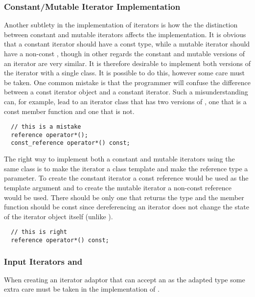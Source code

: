 \documentclass{netobjectdays}
\begin{document}
\subsubsection{Constant/Mutable Iterator Implementation}

Another subtlety in the implementation of iterators is how the the
distinction between constant and mutable iterators affects the
implementation. It is obvious that a constant iterator should have a
const  type, while a mutable iterator should have a
non-const , though in other regards the constant and
mutable versions of an iterator are very similar. It is therefore
desirable to implement both versions of the iterator with a single
class. It is possible to do this, however some care must be taken.
One common mistake is that the programmer will confuse the difference
between a const iterator object and a constant iterator. Such a
misunderstanding can, for example, lead to an iterator class that has
two versions of , one that is a const member function
and one that is not.
 
{\footnotesize
\begin{verbatim}
  // this is a mistake
  reference operator*();
  const_reference operator*() const;
\end{verbatim}
}

The right way to implement both a constant and mutable iterators using
the same class is to make the iterator a class template and make the
reference type a parameter. To create the constant iterator a const
reference would be used as the template argument and to create the
mutable iterator a non-const reference would be used. There should be
only one  that returns the  type and
the member function should be const since dereferencing an iterator
does not change the state of the iterator object itself (unlike
).

{\footnotesize
\begin{verbatim}
  // this is right
  reference operator*() const;
\end{verbatim}
}


\subsubsection{Input Iterators and }

When creating an iterator adaptor that can accept an
 as the adapted type some extra care must be
taken in the implementation of . 
\end{document}
